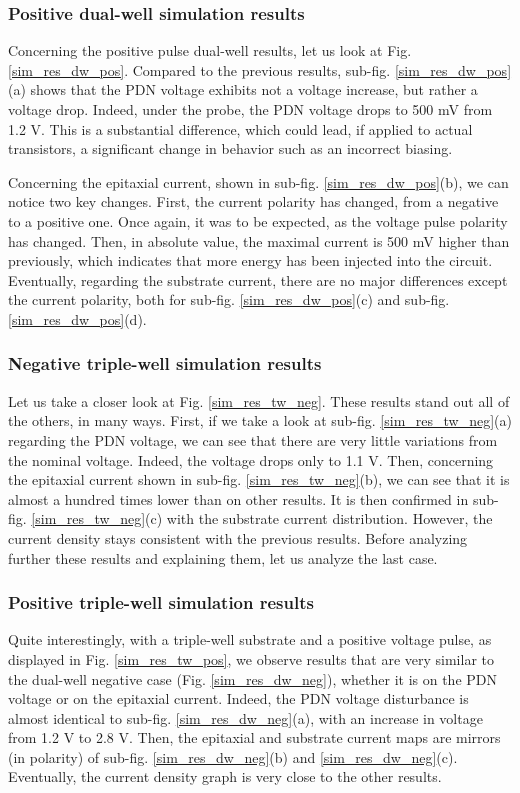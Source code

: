 	\subsubsection{Positive dual-well simulation results}
		Concerning the positive pulse dual-well results, let us look at Fig. \ref{sim_res_dw_pos}.
		Compared to the previous results, sub-fig. \ref{sim_res_dw_pos}(a) shows that the PDN voltage exhibits not a voltage increase, but rather a voltage drop.
		Indeed, under the probe, the PDN voltage drops to 500 mV from 1.2 V.
		This is a substantial difference, which could lead, if applied to actual transistors, a significant change in behavior such as an incorrect biasing.

		Concerning the epitaxial current, shown in sub-fig. \ref{sim_res_dw_pos}(b), we can notice two key changes.
		First, the current polarity has changed, from a negative to a positive one.
		Once again, it was to be expected, as the voltage pulse polarity has changed.
		Then, in absolute value, the maximal current is 500 mV higher than previously, which indicates that more energy has been injected into the circuit.
		Eventually, regarding the substrate current, there are no major differences except the current polarity, both for sub-fig. \ref{sim_res_dw_pos}(c) and sub-fig. \ref{sim_res_dw_pos}(d).

	\subsubsection{Negative triple-well simulation results}
		Let us take a closer look at Fig. \ref{sim_res_tw_neg}.
		These results stand out all of the others, in many ways.
		First, if we take a look at sub-fig. \ref{sim_res_tw_neg}(a) regarding the PDN voltage, we can see that there are very little variations from the nominal voltage.
		Indeed, the voltage drops only to 1.1 V.
		Then, concerning the epitaxial current shown in sub-fig. \ref{sim_res_tw_neg}(b), we can see that it is almost a hundred times lower than on other results.
		It is then confirmed in sub-fig. \ref{sim_res_tw_neg}(c) with the substrate current distribution.
		However, the current density stays consistent with the previous results.
		Before analyzing further these results and explaining them, let us analyze the last case.

	\subsubsection{Positive triple-well simulation results}
		Quite interestingly, with a triple-well substrate and a positive voltage pulse, as displayed in Fig. \ref{sim_res_tw_pos}, we observe results that are very similar to the dual-well negative case (Fig. \ref{sim_res_dw_neg}), whether it is on the PDN voltage or on the epitaxial current.
		Indeed, the PDN voltage disturbance is almost identical to sub-fig. \ref{sim_res_dw_neg}(a), with an increase in voltage from 1.2 V to 2.8 V.
		Then, the epitaxial and substrate current maps are mirrors (in polarity) of sub-fig. \ref{sim_res_dw_neg}(b) and \ref{sim_res_dw_neg}(c).
		Eventually, the current density graph is very close to the other results.


